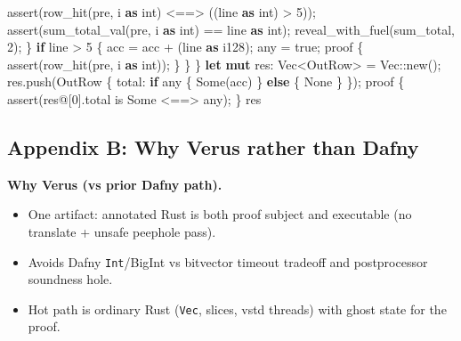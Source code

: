 \documentclass[
  10pt,
]{article}
\newenvironment{Shaded}{}{}
\newcommand{\ConstantTok}[1]{\textcolor[rgb]{0.53,0.00,0.00}{#1}}
\newcommand{\ControlFlowTok}[1]{\textcolor[rgb]{0.00,0.44,0.13}{\textbf{#1}}}
\newcommand{\DataTypeTok}[1]{\textcolor[rgb]{0.56,0.13,0.00}{#1}}
\newcommand{\DecValTok}[1]{\textcolor[rgb]{0.25,0.63,0.44}{#1}}
\newcommand{\KeywordTok}[1]{\textcolor[rgb]{0.00,0.44,0.13}{\textbf{#1}}}
\newcommand{\NormalTok}[1]{#1}
\newcommand{\OperatorTok}[1]{\textcolor[rgb]{0.40,0.40,0.40}{#1}}
\newcommand{\PreprocessorTok}[1]{\textcolor[rgb]{0.74,0.48,0.00}{#1}}
\providecommand{\tightlist}{%
  \setlength{\itemsep}{0pt}\setlength{\parskip}{0pt}}
\begin{document}
\begin{Shaded}
\begin{Highlighting}[]
\NormalTok{            assert(row\_hit(pre}\OperatorTok{,}\NormalTok{ i }\KeywordTok{as}\NormalTok{ int) }\OperatorTok{\textless{}==\textgreater{}}\NormalTok{ ((line }\KeywordTok{as}\NormalTok{ int) }\OperatorTok{\textgreater{}} \DecValTok{5}\NormalTok{))}\OperatorTok{;}
\NormalTok{            assert(sum\_total\_val(pre}\OperatorTok{,}\NormalTok{ i }\KeywordTok{as}\NormalTok{ int) }\OperatorTok{==}\NormalTok{ line }\KeywordTok{as}\NormalTok{ int)}\OperatorTok{;}
\NormalTok{            reveal\_with\_fuel(sum\_total}\OperatorTok{,} \DecValTok{2}\NormalTok{)}\OperatorTok{;}
        \OperatorTok{\}}
        \ControlFlowTok{if}\NormalTok{ line }\OperatorTok{\textgreater{}} \DecValTok{5} \OperatorTok{\{}
\NormalTok{            acc }\OperatorTok{=}\NormalTok{ acc }\OperatorTok{+}\NormalTok{ (line }\KeywordTok{as} \DataTypeTok{i128}\NormalTok{)}\OperatorTok{;}
\NormalTok{            any }\OperatorTok{=} \ConstantTok{true}\OperatorTok{;}
\NormalTok{            proof }\OperatorTok{\{}
\NormalTok{                assert(row\_hit(pre}\OperatorTok{,}\NormalTok{ i }\KeywordTok{as}\NormalTok{ int))}\OperatorTok{;}
            \OperatorTok{\}}
        \OperatorTok{\}}
    \OperatorTok{\}}
    \KeywordTok{let} \KeywordTok{mut}\NormalTok{ res}\OperatorTok{:} \DataTypeTok{Vec}\OperatorTok{\textless{}}\NormalTok{OutRow}\OperatorTok{\textgreater{}} \OperatorTok{=} \DataTypeTok{Vec}\PreprocessorTok{::}\NormalTok{new()}\OperatorTok{;}
\NormalTok{    res}\OperatorTok{.}\NormalTok{push(OutRow }\OperatorTok{\{}\NormalTok{ total}\OperatorTok{:} \ControlFlowTok{if}\NormalTok{ any }\OperatorTok{\{} \ConstantTok{Some}\NormalTok{(acc) }\OperatorTok{\}} \ControlFlowTok{else} \OperatorTok{\{} \ConstantTok{None} \OperatorTok{\}} \OperatorTok{\}}\NormalTok{)}\OperatorTok{;}
\NormalTok{    proof }\OperatorTok{\{}
\NormalTok{        assert(res}\OperatorTok{@}\NormalTok{[}\DecValTok{0}\NormalTok{]}\OperatorTok{.}\NormalTok{total is }\ConstantTok{Some} \OperatorTok{\textless{}==\textgreater{}}\NormalTok{ any)}\OperatorTok{;}
    \OperatorTok{\}}
\NormalTok{    res}
\end{Highlighting}
\end{Shaded}

\subsection{Appendix B: Why Verus rather than
Dafny}\label{appendix-b-why-verus-rather-than-dafny}

\textbf{Why Verus (vs prior Dafny path).}

\begin{itemize}
\tightlist
\item
  One artifact: annotated Rust is both proof subject and executable (no
  translate + unsafe peephole pass).
\item
  Avoids Dafny \texttt{Int}/BigInt vs bitvector timeout tradeoff and
  postprocessor soundness hole.
\item
  Hot path is ordinary Rust (\texttt{Vec}, slices, vstd threads) with
  ghost state for the proof.
\end{itemize}
\end{document}
